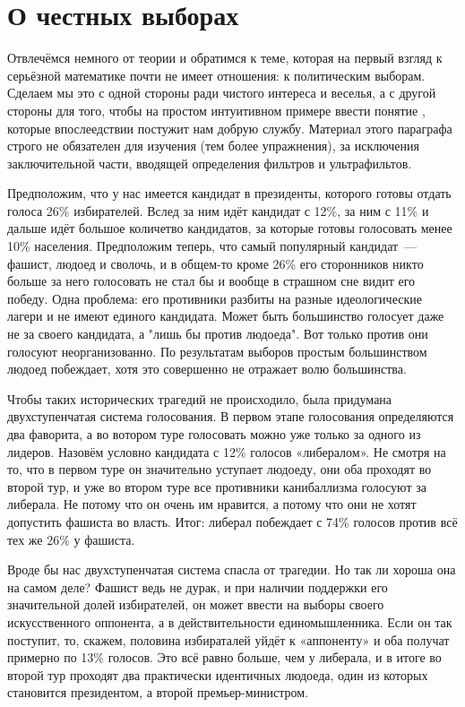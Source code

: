 \section{О честных выборах}

Отвлечёмся немного от теории и обратимся к теме, которая на первый взгляд к серьёзной математике почти не имеет отношения: к политическим выборам. Сделаем мы это с одной стороны ради чистого интереса и веселья, а с другой стороны для того, чтобы на простом интуитивном примере ввести понятие , которые впослеедствии постужит нам добрую службу. Материал этого параграфа строго не обязателен для изучения (тем более упражнения), за исключения заключительной части, вводящей определения фильтров и ультрафильтов.

Предположим, что у нас имеется кандидат в президенты, которого готовы отдать голоса 26\% избирателей. Вслед за ним идёт кандидат с 12\%, за ним с 11\% и дальше идёт большое количетво кандидатов, за которые готовы голосовать менее 10\% населения. Предположим теперь, что самый популярный кандидат~— фашист, людоед и сволочь, и в общем-то кроме 26\% его сторонников никто больше за него голосовать не стал бы и вообще в страшном сне видит его победу. Одна проблема: его противники разбиты на разные идеологические лагери и не имеют единого кандидата. Может быть большинство голосует даже не за своего кандидата, а "лишь бы против людоеда". Вот только против они голосуют неорганизованно. По результатам выборов простым большинством людоед побеждает, хотя это совершенно не отражает волю большинства.

Чтобы таких исторических трагедий не происходило, была придумана двухступенчатая система голосования. В первом этапе голосования определяются два фаворита, а во вотором туре голосовать можно уже только за одного из лидеров. Назовём условно кандидата с 12\% голосов «либералом». Не смотря на то, что в первом туре он значительно уступает людоеду, они оба проходят во второй тур, и уже во втором туре все противники канибаллизма голосуют за либерала. Не потому что он очень им нравится, а потому что они не хотят допустить фашиста во власть. Итог: либерал побеждает с 74\% голосов против всё тех же 26\% у фашиста.

Вроде бы нас двухступенчатая система спасла от трагедии. Но так ли хороша она на самом деле? Фашист ведь не дурак, и при наличии поддержки его значительной долей избирателей, он может ввести на выборы своего искусственного оппонента, а в действительности единомышленника. Если он так поступит, то, скажем, половина избираталей уйдёт к «аппоненту» и оба получат примерно по 13\% голосов. Это всё равно больше, чем у либерала, и в итоге во второй тур проходят два практически идентичных людоеда, один из которых становится президентом, а второй премьер-министром.

